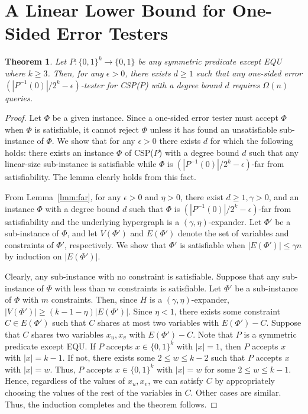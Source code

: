 \documentclass[letterpaper,11pt]{article}
\newtheorem{theorem}{Theorem}[section]
\newcommand{\bit}{\{0,1\}}
\newcommand{\csp}[1]{\textsf{CSP}(#1)\xspace}
\newcommand{\equ}{\textsf{EQU}\xspace}
\begin{document}
\section{A Linear Lower Bound for One-Sided Error Testers}\label{apx:one-sided}
\begin{theorem}\label{thr:one-sided-weak}
  Let $P:\bit^k\to\bit$ be any symmetric predicate except \equ where $k\geq 3$.
  Then,
  for any $\epsilon>0$, 
  there exists $d\geq 1$ such that any one-sided error $(|P^{-1}(0)|/2^k-\epsilon)$-tester for \csp{$P$} with a degree bound $d$ requires $\Omega(n)$ queries.
\end{theorem}
\begin{proof}
  Let $\Phi$ be a given instance.
  Since a one-sided error tester must accept $\Phi$ when $\Phi$ is satisfiable,
  it cannot reject $\Phi$ unless it has found an unsatisfiable sub-instance of $\Phi$.
  We show that for any $\epsilon>0$ there exists $d$ for which the following holds: 
  there exists an instance $\Phi$ of \csp{$P$} with a degree bound $d$ such that any linear-size sub-instance is satisfiable while $\Phi$ is $(|P^{-1}(0)|/2^k-\epsilon)$-far from satisfiability.
  The lemma clearly holds from this fact.

  From Lemma~\ref{lmm:far}, 
  for any $\epsilon>0$ and $\eta>0$,
  there exist $d\geq 1, \gamma>0$, and an instance $\Phi$ with a degree bound $d$ such that $\Phi$ is $(|P^{-1}(0)|/2^k-\epsilon)$-far from satisfiability and the underlying hypergraph is a $(\gamma,\eta)$-expander.
  Let $\Phi'$ be a sub-instance of $\Phi$,
  and let $V(\Phi')$ and $E(\Phi')$ denote the set of variables and constraints of $\Phi'$, respectively.
  We show that $\Phi'$ is satisfiable when $|E(\Phi')|\leq \gamma n$ by induction on $|E(\Phi')|$.

  Clearly, any sub-instance with no constraint is satisfiable.
  Suppose that any sub-instance of $\Phi$ with less than $m$ constraints is satisfiable.
  Let $\Phi'$ be a sub-instance of $\Phi$ with $m$ constraints.
  Then, since $H$ is a $(\gamma,\eta)$-expander,
  $|V(\Phi')|\geq (k-1-\eta)|E(\Phi')|$.
  Since $\eta<1$, 
  there exists some constraint $C\in E(\Phi')$ such that $C$ shares at most two variables with $E(\Phi')-C$.
  Suppose that $C$ shares two variables $x_u,x_v$ with $E(\Phi')-C$.
  Note that $P$ is a symmetric predicate except \equ.
  If $P$ accepts $x\in \bit^k$ with $|x|=1$, 
  then $P$ accepts $x$ with $|x|=k-1$.
  If not, there exists some $2\leq w \leq k-2$ such that $P$ accepts $x$ with $|x|=w$.
  Thus, $P$ accepts $x\in \bit^k$ with $|x|=w$ for some $2\leq w \leq k-1$.
  Hence, regardless of the values of $x_u,x_v$,
  we can satisfy $C$ by appropriately choosing the values of the rest of the variables in $C$.
  Other cases are similar.
  Thus, the induction completes and the theorem follows.
\end{proof}
\end{document}
